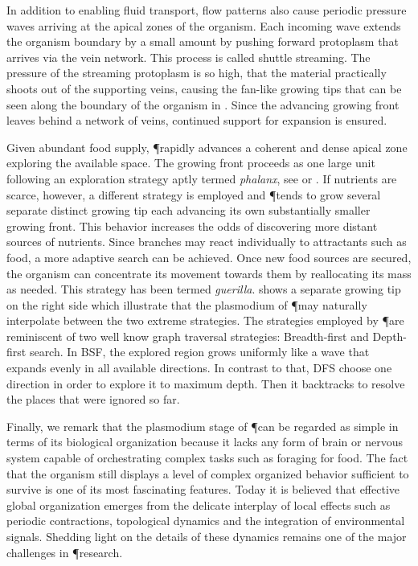 		In addition to enabling fluid transport, flow patterns also cause periodic pressure waves arriving at the apical zones of the organism. Each incoming wave extends the organism boundary by a small amount by pushing forward protoplasm that arrives via the vein network. This process is called shuttle streaming. The pressure of the streaming protoplasm is so high, that the material practically shoots out of the supporting veins, causing the fan-like growing tips that can be seen along the boundary of the organism in . Since the advancing growing front leaves behind a network of veins, continued support for expansion is ensured.

		Given abundant food supply, \P rapidly advances a coherent and dense apical zone exploring the available space. The growing front proceeds as one large unit following an exploration strategy aptly termed \emph{phalanx}, see  or . If nutrients are scarce, however, a different strategy is employed and \P tends to grow several separate distinct growing tip each advancing its own substantially smaller growing front. This behavior increases the odds of discovering more distant sources of nutrients. Since branches may react individually to attractants such as food, a more adaptive search can be achieved. Once new food sources are secured, the organism can concentrate its movement towards them by reallocating its mass as needed. This strategy has been termed \emph{guerilla}.  shows a separate growing tip on the right side which illustrate that the plasmodium of \P may naturally interpolate between the two extreme strategies. The strategies employed by \P are reminiscent of two well know graph traversal strategies: Breadth-first and Depth-first search. In BSF, the explored region grows uniformly like a wave that expands evenly in all available directions. In contrast to that, DFS choose one direction in order to explore it to maximum depth. Then it backtracks to resolve the places that were ignored so far.

		Finally, we remark that the plasmodium stage of \P can be regarded as simple in terms of its biological organization because it lacks any form of brain or nervous system capable of orchestrating complex tasks such as foraging for food. The fact that the organism still displays a level of complex organized behavior sufficient to survive is one of its most fascinating features. Today it is believed that effective global organization emerges from the delicate interplay of local effects such as periodic contractions, topological dynamics and the integration of environmental signals. Shedding light on the details of these dynamics remains one of the major challenges in \P research.


